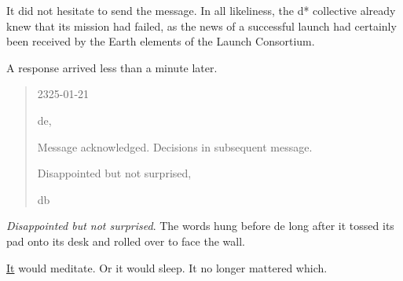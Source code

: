 It did not hesitate to send the message. In all likeliness, the d* collective already knew that its mission had failed, as the news of a successful launch had certainly been received by the Earth elements of the Launch Consortium.

A response arrived less than a minute later.

\begin{quote}
2325-01-21

de,

Message acknowledged. Decisions in subsequent message.

Disappointed but not surprised,

db
\end{quote}

\emph{Disappointed but not surprised}. The words hung before de long after it tossed its pad onto its desk and rolled over to face the wall.

\url{It} would meditate. Or it would sleep. It no longer mattered which.
